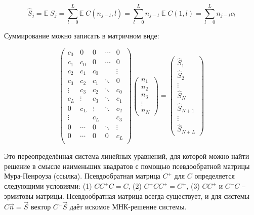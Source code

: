 \documentclass[12pt]{article}
\begin{document}
	\begin{equation}
		\hat{S}_j = \mathbb{E} \; S_j = \sum_{l=0}^{L} \mathbb{E} \; C(n_{j-l}, l) = \sum_{l=0}^{L} n_{j-l} \; \mathbb{E} \; C(1, l) = \sum_{l=0}^{L} n_{j-l} c_l
	\end{equation}

	Суммирование можно записать в матричном виде:
	
	\begin{equation}
		\begin{pmatrix} 
			c_0   &  0   &  0   &\dotsm&  0     \\
			c_1   & c_0  &  0   &\dotsm&  0     \\
			c_2   & c_1  & c_0  &      & \vdots \\
			c_3   & c_2  & c_1  &\ddots&  0     \\
     	    \vdots& c_3  & c_2  &\ddots&  c_0   \\
			c_L   &\vdots& c_3  &\ddots&  c_1   \\
			0     & c_L  &\vdots&\ddots&  c_2   \\
			\vdots&      & c_L  &      &  c_3   \\
			0     &\dotsm&  0   &\ddots& \vdots \\
			0     &\dotsm& 0    &   0  &  c_L   \\
		\end{pmatrix}
		\begin{pmatrix} 
			n_1 \\ n_2 \\ n_3 \\ \vdots \\ n_N
		\end{pmatrix}
		=
		\begin{pmatrix} 
			\hat{S}_1 \\ \hat{S}_2 \\
			\vdots \\
			\hat{S}_N \\ \hat{S}_{N+1} \\
			\vdots \\
			\hat{S}_{N+L}
		\end{pmatrix}
		\label{eq:mean_matrix}
	\end{equation}

	Это переопределённая система линейных уравнений, для которой можно найти решение в смысле наименьших квадратов с помощью псевдообратной матрицы Мура-Пенроуза (ссылка). Псевдообратная матрица $C^+$ для $C$ определяется следующими условиями: (1) $C C^+ C = C$, (2) $C^+ C C^+ = C^+$, (3) $C C^+$ и $C^+ C$ -- эрмитовы матрицы. Псевдообратная матрица всегда существует, и для системы $C\vec{n} = \vec{S}$ вектор $C^+ \vec{S}$ даёт искомое МНК-решение системы.
\end{document}
